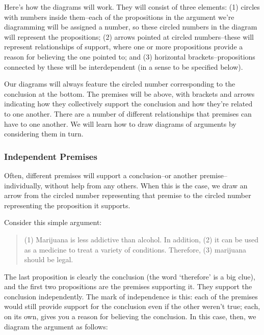 Here's how the diagrams will work. They will consist of three elements: (1) circles with numbers
inside them--each of the propositions in the argument we're diagramming will be assigned a
number, so these circled numbers in the diagram will represent the propositions; (2) arrows pointed
at circled numbers--these will represent relationships of support, where one or more propositions
provide a reason for believing the one pointed to; and (3) horizontal brackets--propositions
connected by these will be interdependent (in a sense to be specified below).

Our diagrams will always feature the circled number corresponding to the conclusion at the
bottom. The premises will be above, with brackets and arrows indicating how they collectively
support the conclusion and how they're related to one another. There are a number of different
relationships that premises can have to one another. We will learn how to draw diagrams of
arguments by considering them in turn.

\subsubsection{Independent Premises}

Often, different premises will support a conclusion--or another premise--individually, without
help from any others. When this is the case, we draw an arrow from the circled number
representing that premise to the circled number representing the proposition it supports.

Consider this simple argument:

\begin{quote}
(1) Marijuana is less addictive than alcohol. In addition, (2) it can be used as a medicine to
treat a variety of conditions. Therefore, (3) marijuana should be legal.
\end{quote}

The last proposition is clearly the conclusion (the word `therefore' is a big clue), and the first two
propositions are the premises supporting it. They support the conclusion independently. The mark
of independence is this: each of the premises would still provide support for the conclusion even
if the other weren't true; each, on its own, gives you a reason for believing the conclusion. In this
case, then, we diagram the argument as follows: \\

